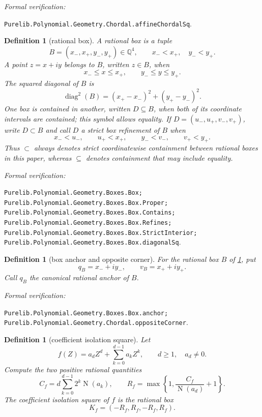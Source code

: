 \documentclass[11pt]{article}
\newtheorem{definition}[theorem]{Definition}
\newcommand{\Q}{\mathbb{Q}}
\newcommand{\Norm}[1]{\operatorname{N}\!\left(#1\right)}
\newcommand{\diamq}{\operatorname{diag}^{2}}
\newcommand{\leanref}[1]{\par\smallskip\noindent
  \emph{Formal verification:}\par\nobreak
  {\raggedright\nolinkurl{#1}.\par}}
\begin{document}
\leanref{Purelib.Polynomial.Geometry.Chordal.affineChordalSq}

\begin{definition}[rational box]
\label{def:rational-box}
A \emph{rational box} is a tuple
\[
 B=(x_-,x_+,y_-,y_+)\in\Q^4,
 \qquad x_-<x_+,\quad y_-<y_+.
\]
A point $z=x+iy$ belongs to $B$, written $z\in B$, when
\[
        x_-\le x\le x_+,\qquad y_-\le y\le y_+.
\]
The \emph{squared diagonal} of $B$ is
\[
       \diamq(B)=(x_+-x_-)^2+(y_+-y_-)^2.
\]
One box is contained in another, written $D\subseteq B$, when both of its
coordinate intervals are contained; this symbol allows equality.  If
$D=(u_-,u_+,v_-,v_+)$, write $D\subset B$ and call $D$ a \emph{strict box
refinement} of $B$ when
\[
 x_-<u_-,\qquad u_+<x_+,\qquad
 y_-<v_-,\qquad v_+<y_+.
\]
Thus $\subset$ always denotes strict coordinatewise containment between
rational boxes in this paper, whereas $\subseteq$ denotes containment that
may include equality.
\end{definition}

\leanref{Purelib.Polynomial.Geometry.Boxes.Box; Purelib.Polynomial.Geometry.Boxes.Box.Proper;
Purelib.Polynomial.Geometry.Boxes.Box.Contains; Purelib.Polynomial.Geometry.Boxes.Box.Refines;
Purelib.Polynomial.Geometry.Boxes.Box.StrictInterior; Purelib.Polynomial.Geometry.Boxes.Box.diagonalSq}

\begin{definition}[box anchor and opposite corner]
\label{def:box-corners}
For the rational box $B$ of \cref{def:rational-box}, put
\[
 q_B=x_-+iy_-,
 \qquad
 v_B=x_++iy_+.
\]
Call $q_B$ the canonical rational \emph{anchor} of $B$.
\end{definition}

\leanref{Purelib.Polynomial.Geometry.Boxes.Box.anchor; Purelib.Polynomial.Geometry.Chordal.oppositeCorner}

\begin{definition}[coefficient isolation square]
\label{def:coefficient-isolation-square}
Let
\[
       f(Z)=a_dZ^d+\sum_{k=0}^{d-1}a_kZ^k,
       \qquad d\ge1,\quad a_d\ne0.
\]
Compute the two positive rational quantities
\begin{equation}
\label{eq:isolation-radius}
 C_f=d\sum_{k=0}^{d-1}2^k\Norm{a_k},
 \qquad
 R_f=\max\left\{1,\frac{C_f}{\Norm{a_d}}+1\right\}.
\end{equation}
The \emph{coefficient isolation square} of $f$ is the rational box
\[
                     K_f=(-R_f,R_f,-R_f,R_f).
\]
\end{definition}
\end{document}
